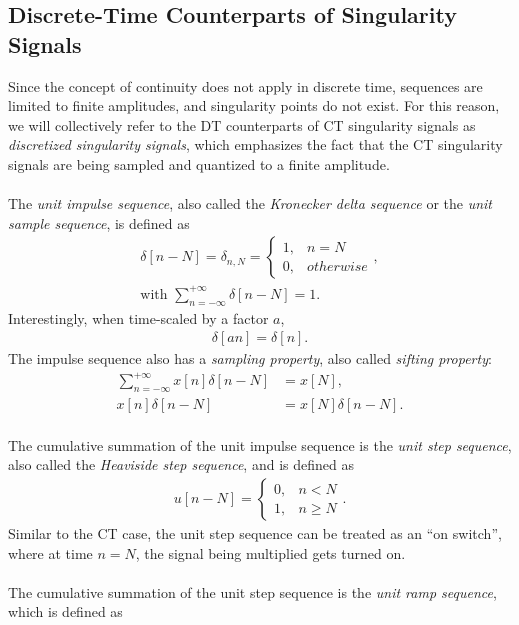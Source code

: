 \documentclass{report}
\begin{document}
\subsection{Discrete-Time Counterparts of Singularity Signals}
Since the concept of continuity does not apply in discrete time, sequences are limited to finite amplitudes, and singularity points do not exist. 
For this reason, we will collectively refer to the DT counterparts of CT singularity signals as \emph{discretized singularity signals}, which 
emphasizes the fact that the CT singularity signals are being sampled and quantized to a finite amplitude.
\\ \\
The \emph{unit impulse sequence}, also called the \emph{Kronecker delta sequence} or the \emph{unit sample sequence}, is defined as 
\begin{align}
    \delta[n-N] = \delta_{n,N} =
    \begin{cases} 
        1, & n=N \\
        0, & otherwise
    \end{cases}, \\
    \text{with } \sum_{n=-\infty}^{+\infty} \delta[n-N] = 1.
\end{align}
Interestingly, when time-scaled by a factor $a$,
\begin{align}
    \delta[an] = \delta[n].
\end{align}
The impulse sequence also has a \emph{sampling property}, also called \emph{sifting property}:
\begin{align}
    \sum_{n=-\infty}^{+\infty} x[n]\delta[n-N]&= x[N], \\
    x[n]\delta[n-N] &= x[N]\delta[n-N].
\end{align} \\
The cumulative summation of the unit impulse sequence is the \emph{unit step sequence}, also called the \emph{Heaviside step sequence}, and is defined as 
\begin{align}
    u[n-N] = 
    \begin{cases} 
        0, & n<N \\
        1, & n\geq N
    \end{cases}.
\end{align}
Similar to the CT case, the unit step sequence can be treated as an ``on switch'', where at time $n=N$, the signal being multiplied gets turned on. 
\\ \\
The cumulative summation of the unit step sequence is the \emph{unit ramp sequence}, which is defined as
\end{document}
